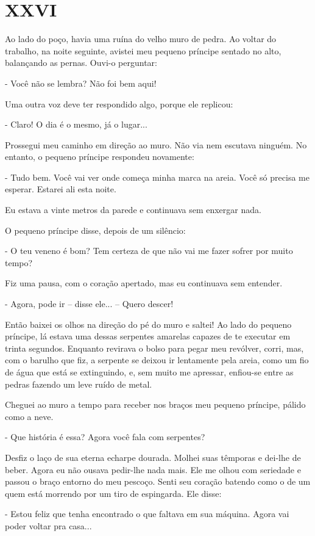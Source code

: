 \chapter{XXVI}

Ao lado do poço, havia uma ruína do velho muro de pedra. Ao voltar do
trabalho, na noite seguinte, avistei meu pequeno príncipe sentado no
alto, balançando as pernas. Ouvi-o perguntar:

- Você não se lembra? Não foi bem aqui!

Uma outra voz deve ter respondido algo, porque ele replicou:

- Claro! O dia é o mesmo, já o lugar...

Prossegui meu caminho em direção ao muro. Não via nem escutava ninguém.
No entanto, o pequeno príncipe respondeu novamente:

- Tudo bem. Você vai ver onde começa minha marca na areia. Você só
precisa me esperar. Estarei ali esta noite.

Eu estava a vinte metros da parede e continuava sem enxergar nada.

O pequeno príncipe disse, depois de um silêncio:

- O teu veneno é bom? Tem certeza de que não vai me fazer sofrer por
muito tempo?

Fiz uma pausa, com o coração apertado, mas eu continuava sem entender.

- Agora, pode ir -- disse ele... -- Quero descer!

Então baixei os olhos na direção do pé do muro e saltei! Ao lado do
pequeno príncipe, lá estava uma dessas serpentes amarelas capazes de te
executar em trinta segundos. Enquanto revirava o bolso para pegar meu
revólver, corri, mas, com o barulho que fiz, a serpente se deixou ir
lentamente pela areia, como um fio de água que está se extinguindo, e,
sem muito me apressar, enfiou-se entre as pedras fazendo um leve ruído
de metal.

Cheguei ao muro a tempo para receber nos braços meu pequeno príncipe,
pálido como a neve.

- Que história é essa? Agora você fala com serpentes?

Desfiz o laço de sua eterna echarpe dourada. Molhei suas têmporas e
dei-lhe de beber. Agora eu não ousava pedir-lhe nada mais. Ele me olhou
com seriedade e passou o braço entorno do meu pescoço. Senti seu coração
batendo como o de um quem está morrendo por um tiro de espingarda. Ele
disse:

- Estou feliz que tenha encontrado o que faltava em sua máquina. Agora
vai poder voltar pra casa...

